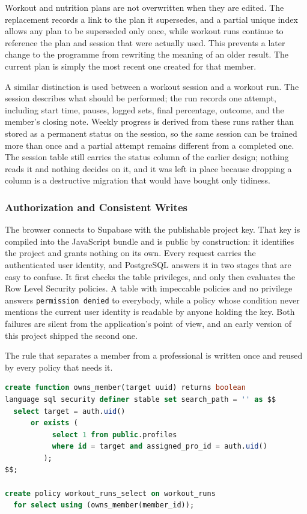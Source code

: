 Workout and nutrition plans are not overwritten when they are edited. The replacement records a link to the plan it supersedes, and a partial unique index allows any plan to be superseded only once, while workout runs continue to reference the plan and session that were actually used. This prevents a later change to the programme from rewriting the meaning of an older result. The current plan is simply the most recent one created for that member.

A similar distinction is used between a workout session and a workout run. The session describes what should be performed; the run records one attempt, including start time, pauses, logged sets, final percentage, outcome, and the member's closing note. Weekly progress is derived from these runs rather than stored as a permanent status on the session, so the same session can be trained more than once and a partial attempt remains different from a completed one. The session table still carries the status column of the earlier design; nothing reads it and nothing decides on it, and it was left in place because dropping a column is a destructive migration that would have bought only tidiness.

\subsubsection{Authorization and Consistent Writes}\label{subsubsect:AuthorizationConsistentWrites}

The browser connects to Supabase with the publishable project key. That key is compiled into the JavaScript bundle and is public by construction: it identifies the project and grants nothing on its own. Every request carries the authenticated user identity, and PostgreSQL answers it in two stages that are easy to confuse. It first checks the table privileges, and only then evaluates the Row Level Security policies. A table with impeccable policies and no privilege answers \texttt{permission denied} to everybody, while a policy whose condition never mentions the current user identity is readable by anyone holding the key. Both failures are silent from the application's point of view, and an early version of this project shipped the second one.

The rule that separates a member from a professional is written once and reused by every policy that needs it.

\begin{lstlisting}[language=SQL,caption={The predicate that encodes ownership, and one of the policies built on it.},label={lst:ownsMember}]
create function owns_member(target uuid) returns boolean
language sql security definer stable set search_path = '' as $$
  select target = auth.uid()
      or exists (
           select 1 from public.profiles
           where id = target and assigned_pro_id = auth.uid()
         );
$$;

create policy workout_runs_select on workout_runs
  for select using (owns_member(member_id));
\end{lstlisting}


